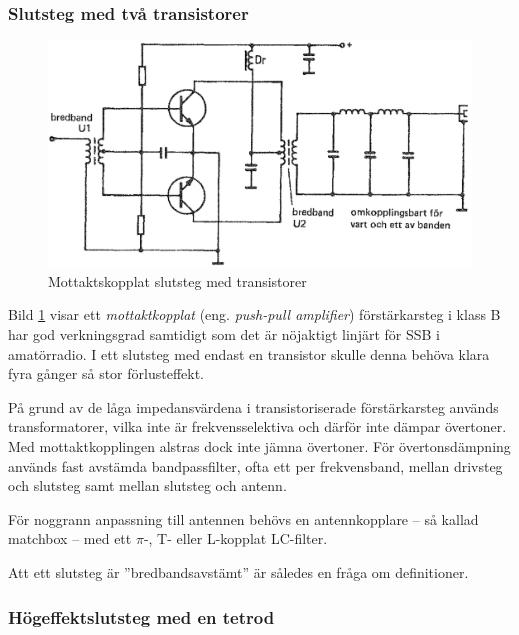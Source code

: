 \subsubsection{Slutsteg med två transistorer}

\begin{figure}
\includegraphics[width=\textwidth]{images/cropped_pdfs/bild_2_3-49.pdf}
\caption{Mottaktskopplat slutsteg med transistorer}
\label{fig:BildII3-49}
\end{figure}

Bild \ref{fig:BildII3-49} visar ett \emph{mottaktkopplat} (eng.
\emph{push-pull amplifier}) förstärkarsteg i klass B har god verkningsgrad
samtidigt som det är nöjaktigt linjärt för SSB i amatörradio.
I ett slutsteg med endast en transistor skulle denna behöva klara fyra gånger
så stor förlusteffekt.

På grund av de låga impedansvärdena i transistoriserade förstärkarsteg används
transformatorer, vilka inte är frekvensselektiva och därför inte dämpar
övertoner.
Med mottaktkopplingen alstras dock inte jämna övertoner.
För övertonsdämpning används fast avstämda bandpassfilter, ofta ett per
frekvensband, mellan drivsteg och slutsteg samt mellan slutsteg och antenn.

För noggrann anpassning till antennen behövs en antennkopplare --
så kallad matchbox -- med ett \(\pi \)-, T- eller L-kopplat LC-filter.

Att ett slutsteg är ''bredbandsavstämt'' är således en fråga om definitioner.

\subsubsection{Högeffektslutsteg med en tetrod}

